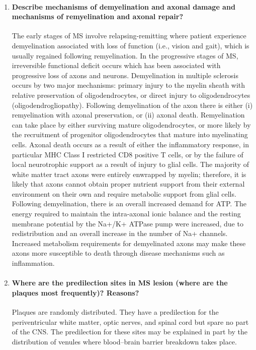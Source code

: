 \documentclass[12pt,article,oneside,a4paper]{memoir}
\begin{document}
\begin{enumerate}
\item \paragraph{Describe mechanisms of demyelination and axonal damage and mechanisms of remyelination and axonal repair?}
The early stages of MS involve relapsing-remitting where patient experience
demyelination associated with loss of function (i.e., vision and gait), which
is usually regained following remyelination. In the progressive stages of MS,
irreversible functional deficit occurs which has been associated with
progressive loss of axons and neurons.
Demyelination in multiple sclerosis occurs by two major mechanisms: primary
injury to the myelin sheath with relative preservation of oligodendrocytes, or
direct injury to oligodendrocytes (oligodendrogliopathy). Following
demyelination of the axon there is either (i) remyelination with axonal
preservation, or (ii) axonal death. Remyelination can take place by either
surviving mature oligodendrocytes, or more likely by the recruitment of
progenitor oligodendrocytes that mature into myelinating cells. Axonal death
occurs as a result of either the inflammatory response, in particular MHC Class
I restricted CD8 positive T cells, or by the failure of local neurotrophic
support as a result of injury to glial cells.
The majority of white matter tract axons were entirely enwrapped by myelin;
therefore, it is likely that axons cannot obtain proper nutrient support from
their external environment on their own and require metabolic support from
glial cells. Following demyelination, there is an overall increased demand for
ATP. The energy required to maintain the intra-axonal ionic balance and the
resting membrane potential by the Na+/K+ ATPase pump were increased, due to
redistribution and an overall increase in the number of Na+ channels.
Increased metabolism requirements for demyelinated axons may make these axons
more susceptible to death through disease mechanisms such as inflammation.

\item \paragraph{Where are the predilection sites in MS lesion (where are the plaques most frequently)? Reasons?}
Plaques are randomly distributed. They have a predilection for the 
periventricular white matter, optic nerves, and spinal cord but spare no part
of the CNS. The predilection for these sites may be explained in part by the
distribution of venules where blood–brain barrier breakdown takes place.


\end{enumerate}
\end{document}
